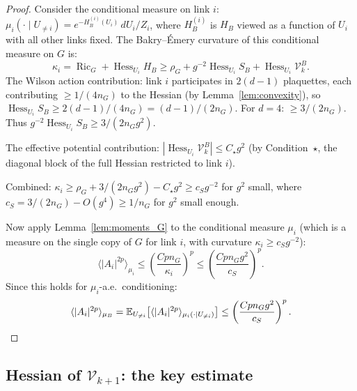 \documentclass[11pt,a4paper]{article}
\theoremstyle{plain}
\theoremstyle{definition}
\theoremstyle{remark}
\newcommand{\E}{\mathbb{E}}
\newcommand{\Hess}{\operatorname{Hess}}
\newcommand{\Ric}{\operatorname{Ric}}
\newcommand{\cV}{\mathcal{V}}
\begin{document}
\begin{proof}
Consider the conditional measure on link $i$:
$\mu_i(\cdot \mid U_{\ne i})
= e^{-H_B^{(i)}(U_i)}\,dU_i / Z_i$,
where $H_B^{(i)}$ is $H_B$ viewed as a function of
$U_i$ with all other links fixed. The Bakry--\'Emery
curvature of this conditional measure on $G$ is:
\begin{equation}
  \kappa_i = \Ric_G + \Hess_{U_i} H_B
  \ge \rho_G + g^{-2}\Hess_{U_i} S_B
  + \Hess_{U_i}\cV_k^B.
\end{equation}
The Wilson action contribution: link $i$ participates
in $2(d-1)$ plaquettes, each contributing
$\ge 1/(4n_G)$ to the Hessian (by
Lemma~\ref{lem:convexity}), so
$\Hess_{U_i} S_B \ge 2(d-1)/(4n_G)
= (d-1)/(2n_G)$. For $d = 4$: $\ge 3/(2n_G)$.
Thus $g^{-2}\Hess_{U_i} S_B \ge 3/(2n_G g^2)$.

The effective potential contribution:
$|\Hess_{U_i}\cV_k^B| \le C_\star g^2$
(by Condition~$\star$, the diagonal block of the
full Hessian restricted to link $i$).

Combined: $\kappa_i \ge \rho_G + 3/(2n_G g^2)
- C_\star g^2 \ge c_S g^{-2}$
for $g^2$ small, where $c_S = 3/(2n_G) - O(g^4)
\ge 1/n_G$ for $g^2$ small enough.

Now apply Lemma~\ref{lem:moments_G} to the conditional
measure $\mu_i$ (which is a measure on the single
copy of $G$ for link $i$, with curvature
$\kappa_i \ge c_S g^{-2}$):
\begin{equation}
  \langle|A_i|^{2p}\rangle_{\mu_i}
  \le \left(\frac{Cpn_G}{\kappa_i}\right)^p
  \le \left(\frac{Cpn_G g^2}{c_S}\right)^p.
\end{equation}
Since this holds for $\mu_i$-a.e.\ conditioning:
\begin{equation}
  \langle|A_i|^{2p}\rangle_{\mu_B}
  = \E_{U_{\ne i}}\bigl[
  \langle|A_i|^{2p}\rangle_{\mu_i(\cdot|U_{\ne i})}
  \bigr]
  \le \left(\frac{Cpn_G g^2}{c_S}\right)^p.
  \qedhere
\end{equation}
\end{proof}

\subsection{Hessian of $\cV_{k+1}$: the key estimate}
\end{document}
